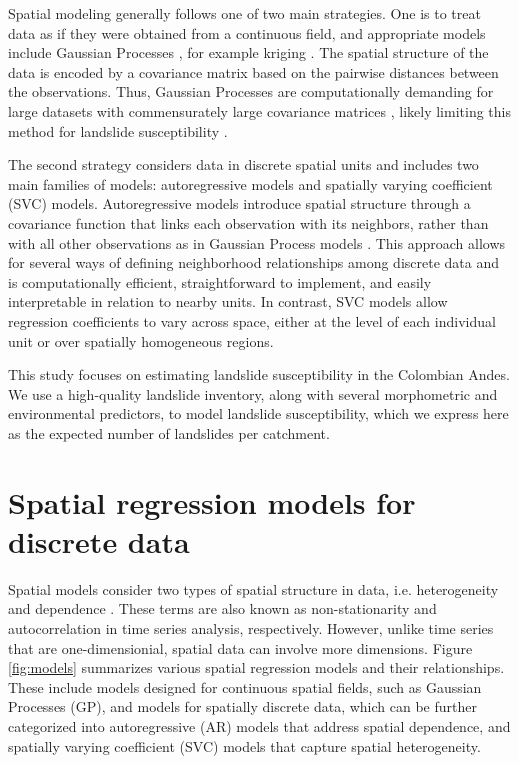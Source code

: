 \documentclass[lineno,pdflatex,sn-basic]{sn-jnl}%
\theoremstyle{thmstyleone}%
\theoremstyle{thmstyletwo}%
\theoremstyle{thmstylethree}%
\begin{document}
Spatial modeling generally follows one of two main strategies. 
One is to treat data as if they were obtained from a continuous field, and appropriate models include Gaussian Processes \citep{rue2005gaussian}, for example kriging \citep{cressie2015statistics}. 
The spatial structure of the data is encoded by a covariance matrix based on the pairwise distances between the observations. 
Thus, Gaussian Processes are computationally demanding for large datasets with commensurately large covariance matrices \citep{banerjee2008gaussian}, likely limiting this method for landslide susceptibility \citep{bryce2022unified}. 

The second strategy considers data in discrete spatial units and includes two main families of models: autoregressive models and spatially varying coefficient (SVC) models. Autoregressive models \citep{anselin1996simple, yadav2023joint} introduce spatial structure through a covariance function that links each observation with its neighbors, rather than with all other observations as in Gaussian Process models \citep{fischer2011spatial, fotheringham2000quantitative}. 
This approach allows for several ways of defining neighborhood relationships among discrete data \citep{getis2009spatial} and is computationally efficient, straightforward to implement, and easily interpretable in relation to nearby units. In contrast, SVC models allow regression coefficients to vary across space, either at the level of each individual unit or over spatially homogeneous regions.

This study focuses on estimating landslide susceptibility in the Colombian Andes. We use a high-quality landslide inventory, along with several morphometric and environmental predictors, to model landslide susceptibility, which we express here as the expected number of landslides per catchment. 

\section{Spatial regression models for discrete data}\label{spatialregression}

Spatial models consider two types of spatial structure in data, i.e. heterogeneity and dependence \citep{anselin1988spatial}.
These terms are also known as non-stationarity and autocorrelation in time series analysis, respectively. 
However, unlike time series that are one-dimensionial, spatial data can involve more dimensions.
Figure \ref{fig:models} summarizes various spatial regression models and their relationships. 
These include models designed for continuous spatial fields, such as Gaussian Processes (GP), and models for spatially discrete data, which can be further categorized into autoregressive (AR) models that address spatial dependence, and spatially varying coefficient (SVC) models that capture spatial heterogeneity. 
\end{document}
